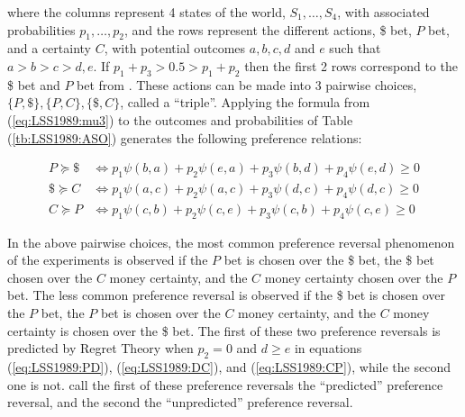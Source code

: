 \documentclass[../main.tex]{subfiles}
\begin{document}
\noindent where the columns represent 4 states of the world, $S_1 , \ldots , S_4$, with associated probabilities $p_1, \ldots, p_2$, and the rows represent the different actions, {\$} bet, $P$ bet, and a certainty $C$, with potential outcomes $a,b,c,d$ and $e$ such that $a > b > c > d,e$.
If $p_1 + p_3 > 0.5 > p_1 + p_2$ then the first 2 rows correspond to the {\$} bet and $P$ bet from \textcite{Grether1979}.
These actions can be made into 3 pairwise choices, $\lbrace P , {\$} \rbrace , \lbrace P,C \rbrace , \lbrace {\$}, C \rbrace$, called a \enquote{triple}.
Applying the formula from (\ref{eq:LSS1989:mu3}) to the outcomes and probabilities of Table (\ref{tb:LSS1989:ASO}) generates the following preference relations:

\begin{align}
	P  \succcurlyeq {\$} &\Leftrightarrow p_1 \psi(b,a) + p_2 \psi(e,a) + p_3 \psi(b,d) + p_4 \psi(e,d) \geq 0 \label{eq:LSS1989:PD}\\
	{\$} \succcurlyeq C  &\Leftrightarrow p_1 \psi(a,c) + p_2 \psi(a,c) + p_3 \psi(d,c) + p_4 \psi(d,c) \geq 0 \label{eq:LSS1989:DC}\\
	C  \succcurlyeq P  &\Leftrightarrow p_1 \psi(c,b) + p_2 \psi(c,e) + p_3 \psi(c,b) + p_4 \psi(c,e) \geq 0 \label{eq:LSS1989:CP}
\end{align}

In the above pairwise choices, the most common preference reversal phenomenon of the \textcite{Grether1979} experiments is observed if the $P$ bet is chosen over the {\$} bet, the {\$} bet chosen over the $C$ money certainty, and the $C$ money certainty chosen over the $P$ bet.
The less common preference reversal is observed if the {\$} bet is chosen over the $P$ bet, the $P$ bet is chosen over the $C$ money certainty, and the $C$ money certainty is chosen over the {\$} bet.
The first of these two preference reversals is predicted by Regret Theory when $p_2 =0$ and $d \geq e$ in equations (\ref{eq:LSS1989:PD}), (\ref{eq:LSS1989:DC}), and (\ref{eq:LSS1989:CP}), while the second one is not.
\textcite[143]{Loomes1989} call the first of these preference reversals the \enquote{predicted} preference reversal, and the second the \enquote{unpredicted} preference reversal.
\end{document}
